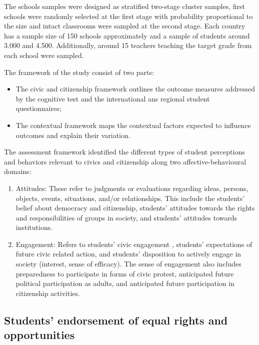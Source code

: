 \documentclass[12pt,a4paper,oneside]{reedthesis}
\providecommand{\tightlist}{%
  \setlength{\itemsep}{0pt}\setlength{\parskip}{0pt}}
\begin{document}
The schools samples were designed as stratified two-stage cluster samples, first schools were randomly selected at the first stage with probability proportional to the size and intact classrooms were sampled at the second stage. Each country has a sample size of 150 schools approximately and a sample of students around 3.000 and 4.500. Additionally, around 15 teachers teaching the target grade from each school were sampled.

The framework of the study consist of two parts:
\begin{itemize}
\tightlist
\item
  The civic and citizenship framework outlines the outcome measures addressed by the cognitive test and the international ans regional student questionnaires;\\
\item
  The contextual framework maps the contextual factors expected to influence outcomes and explain their variation.\\
  \newline  
\end{itemize}
The assessment framework identified the different types of student perceptions and behaviors relevant to civics and citizenship along two affective-behavioural domains:
\begin{enumerate}
\def\labelenumi{\roman{enumi}.}
\tightlist
\item
  Attitudes: These refer to judgments or evaluations regarding ideas, persons, objects, events, situations, and/or relationships. This include the students' belief about democracy and citizenship, students' attitudes towards the rights and responsibilities of groups in society, and students' attitudes towards institutions.\\
\item
  Engagement: Refers to students' civic engagement , students' expectations of future civic related action, and students' disposition to actively engage in society (interest, sense of efficacy). The sense of engagement also includes preparedness to participate in forms of civic protest, anticipated future political participation as adults, and anticipated future participation in citizenship activities.
\end{enumerate}
\hypertarget{students-endorsement-of-equal-rights-and-opportunities}{%
\subsection{Students' endorsement of equal rights and opportunities}\label{students-endorsement-of-equal-rights-and-opportunities}}
\end{document}
